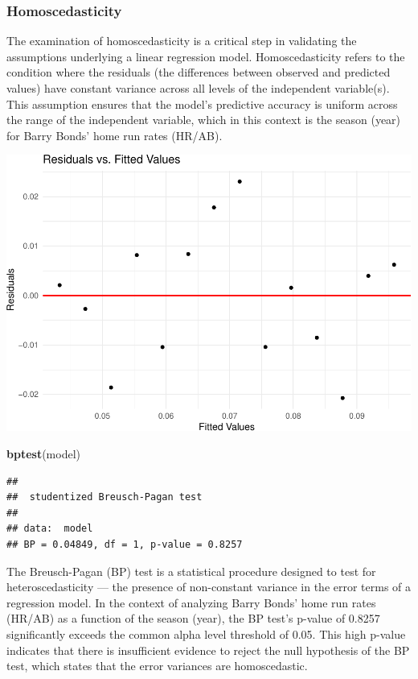 \documentclass[
]{article}
\newenvironment{Shaded}{\begin{snugshade}}{\end{snugshade}}
\newcommand{\FunctionTok}[1]{\textcolor[rgb]{0.13,0.29,0.53}{\textbf{#1}}}
\newcommand{\NormalTok}[1]{#1}
\begin{document}
\subsubsection{Homoscedasticity}\label{homoscedasticity}

The examination of homoscedasticity is a critical step in validating the
assumptions underlying a linear regression model. Homoscedasticity
refers to the condition where the residuals (the differences between
observed and predicted values) have constant variance across all levels
of the independent variable(s). This assumption ensures that the model's
predictive accuracy is uniform across the range of the independent
variable, which in this context is the season (year) for Barry Bonds'
home run rates (HR/AB).

\includegraphics{602_project_files/figure-latex/unnamed-chunk-9-1.pdf}

\begin{Shaded}
\begin{Highlighting}[]
\FunctionTok{bptest}\NormalTok{(model)}
\end{Highlighting}
\end{Shaded}

\begin{verbatim}
## 
##  studentized Breusch-Pagan test
## 
## data:  model
## BP = 0.04849, df = 1, p-value = 0.8257
\end{verbatim}

The Breusch-Pagan (BP) test is a statistical procedure designed to test
for heteroscedasticity --- the presence of non-constant variance in the
error terms of a regression model. In the context of analyzing Barry
Bonds' home run rates (HR/AB) as a function of the season (year), the BP
test's p-value of 0.8257 significantly exceeds the common alpha level
threshold of 0.05. This high p-value indicates that there is
insufficient evidence to reject the null hypothesis of the BP test,
which states that the error variances are homoscedastic.
\end{document}
